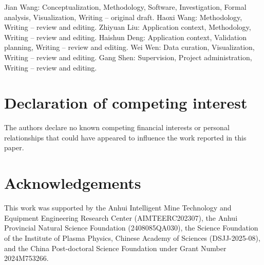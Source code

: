 \documentclass[preprint,12pt]{elsarticle}
\begin{document}
Jian Wang: Conceptualization, Methodology, Software, Investigation, Formal
analysis, Visualization, Writing -- original draft.  Haoxi Wang: Methodology,
Writing -- review and editing.  Zhiyuan Liu: Application context, Methodology,
Writing -- review and editing.  Haishun Deng: Application context, Validation
planning, Writing -- review and editing.  Wei Wen: Data curation,
Visualization, Writing -- review and editing.  Gang Shen: Supervision, Project
administration, Writing -- review and editing.

\section*{Declaration of competing interest}

The authors declare no known competing financial interests or personal
relationships that could have appeared to influence the work reported in this
paper.

\section*{Acknowledgements}

This work was supported by the Anhui Intelligent Mine Technology and Equipment
Engineering Research Center (AIMTEERC202307), the Anhui Provincial Natural
Science Foundation (2408085QA030), the Science Foundation of the Institute of
Plasma Physics, Chinese Academy of Sciences (DSJJ-2025-08), and the China
Post-doctoral Science Foundation under Grant Number 2024M753266.
\end{document}
